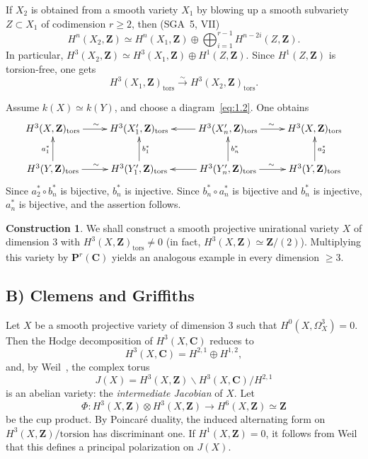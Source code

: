 \documentclass[12pt]{amsart}
\theoremstyle{plain}
\theoremstyle{definition}
\newtheorem{construction}[theorem]{Construction}
\theoremstyle{remark}
\begin{document}
If $X_2$ is obtained from a smooth variety $X_1$ by blowing up a smooth
subvariety $Z\subset X_1$ of codimension $r\geqslant 2$, then
(SGA~5, VII)
\[
H^n(X_2,\mathbf{Z})\simeq H^n(X_1,\mathbf{Z})\oplus\bigoplus_{i=1}^{r-1}H^{n-2i}(Z,\mathbf{Z}).
\]
In particular,
$H^3(X_2,\mathbf{Z})\simeq H^3(X_1,\mathbf{Z})\oplus H^1(Z,\mathbf{Z})$.
Since $H^1(Z,\mathbf{Z})$ is torsion-free, one gets
\[
H^3(X_1,\mathbf{Z})_{\mathrm{tors}}\xrightarrow{\sim}H^3(X_2,\mathbf{Z})_{\mathrm{tors}}.
\]

Assume $k(X)\simeq k(Y)$, and choose a diagram~\eqref{eq:1.2}. One obtains
\[
\xymatrix{
H^3(X,\mathbf Z)_{\mathrm{tors}} \ar[r]^{\sim}
  & H^3(X_1',\mathbf Z)_{\mathrm{tors}}
  & H^3(X_n',\mathbf Z)_{\mathrm{tors}} \ar[l] \ar[r]^{\sim}
  & H^3(X,\mathbf Z)_{\mathrm{tors}} \\
H^3(Y,\mathbf Z)_{\mathrm{tors}} \ar[r]^{\sim} \ar[u]^{a_1^*}
  & H^3(Y_1',\mathbf Z)_{\mathrm{tors}} \ar[u]_{b_1^*}
  & H^3(Y_n',\mathbf Z)_{\mathrm{tors}} \ar[l] \ar[r]^{\sim} \ar[u]_{b_n^*}
  & H^3(Y,\mathbf Z)_{\mathrm{tors}} \ar[u]_{a_2^*}
}
\]
Since $a_2^*\circ b_n^*$ is bijective, $b_n^*$ is injective. Since
$b_n^*\circ a_n^*$ is bijective and $b_n^*$ is injective, $a_n^*$ is bijective, and
the assertion follows.

\begin{construction}\label{cons:2.2}
We shall construct a smooth projective unirational variety $X$ of dimension $3$
with $H^3(X,\mathbf Z)_{\mathrm{tors}}\neq 0$ (in fact,
$H^3(X,\mathbf Z)\simeq \mathbf Z/(2)$). Multiplying this variety by
$\mathbf P^r(\mathbf C)$ yields an analogous example in every dimension
$\geqslant 3$.
\end{construction}

\subsection*{B) Clemens and Griffiths}

Let $X$ be a smooth projective variety of dimension $3$ such that
$H^0(X,\Omega_X^3)=0$. Then the Hodge decomposition of
$H^3(X,\mathbf C)$ reduces to
\[
H^3(X,\mathbf C)=H^{2,1}\oplus H^{1,2},
\]
and, by Weil~\cite{11}, the complex torus
\[
J(X)=H^3(X,\mathbf Z)\backslash H^3(X,\mathbf C)/H^{2,1}
\]
is an abelian variety: the \emph{intermediate Jacobian} of $X$. Let
\[
\Phi:H^3(X,\mathbf Z)\otimes H^3(X,\mathbf Z)\to H^6(X,\mathbf Z)\simeq \mathbf Z
\]
be the cup product. By Poincar\'e duality, the induced alternating form on
$H^3(X,\mathbf Z)/\mathrm{torsion}$ has discriminant one. If
$H^1(X,\mathbf Z)=0$, it follows from Weil~\cite{11} that this defines a principal
polarization on $J(X)$.
\end{document}
